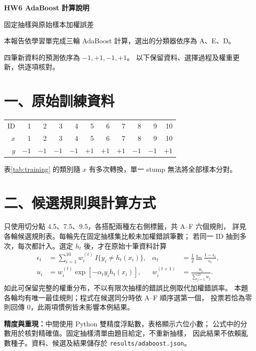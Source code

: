

\begin{center}
{\Large\bfseries HW6 AdaBoost 計算說明}\par
固定抽樣與原始樣本加權誤差
\end{center}
本報告依學習單完成三輪 AdaBoost 計算，選出的分類器依序為 A、E、D。

四筆新資料的預測依序為 $-1,+1,-1,+1$。
以下保留資料、選擇過程及權重更新，供逐項核對。

\section*{一、原始訓練資料}
\begin{center}
\label{tab:training}
\begin{tabular}{rrrrrrrrrrr}\toprule
ID & 1&2&3&4&5&6&7&8&9&10\\
$x$ & 1&2&3&4&5&6&7&8&9&10\\
$y$ & $-1$&$-1$&$-1$&$-1$&$+1$&$+1$&$+1$&$-1$&$-1$&$+1$\\
\bottomrule\end{tabular}
\end{center}
表\ref{tab:training} 的類別隨 $x$ 有多次轉換，單一 stump 無法將全部樣本分對。

\section*{二、候選規則與計算方式}
只使用切分點 4.5、7.5、9.5，各搭配兩種左右側標籤，共 A--F 六個規則，
詳見各輪候選規則表。每輪先在固定抽樣集比較未加權錯誤筆數；
若同一 ID 抽到多次，每次都計入。選定 $h_t$ 後，才在原始十筆資料計算
\begin{align*}
\epsilon_t&=\sum_{i=1}^{10}w_i^{(t)}\,I\{y_i\ne h_t(x_i)\}, &
\alpha_t&=\frac12\ln\frac{1-\epsilon_t}{\epsilon_t},\\
u_i&=w_i^{(t)}\exp[-\alpha_t y_i h_t(x_i)], &
w_i^{(t+1)}&=\frac{u_i}{\sum_{j=1}^{10}u_j}.
\end{align*}
如此可保留完整的權重分布，不以有限次抽樣的錯誤比例取代加權錯誤率。
本題各輪均有唯一最佳規則；程式在候選同分時依 A--F 順序選第一個，
投票若恰為零則回傳 0，此兩項慣例皆未影響本例結果。

\textbf{精度與重現：}中間使用 Python 雙精度浮點數，表格顯示六位小數；
公式中的分數用於核對精確值。固定抽樣清單由題目給定，不重新抽樣，
因此結果不依賴亂數種子。資料、候選及結果儲存於 \texttt{results/adaboost.json}。
\clearpage

\clearpage

\clearpage


\clearpage

